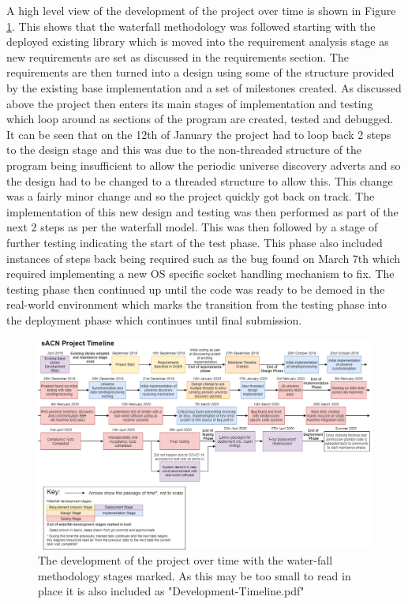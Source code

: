 \documentclass[11pt,a4paper]{article}
\begin{document}
A high level view of the development of the project over time is shown in Figure \ref{project_dev_timeline}. This shows that the waterfall methodology was followed starting with the deployed existing library which is moved into the requirement analysis stage as new requirements are set as discussed in the requirements section. The requirements are then turned into a design using some of the structure provided by the existing base implementation and a set of milestones created. As discussed above the project then enters its main stages of implementation and testing which loop around as sections of the program are created, tested and debugged. It can be seen that on the 12th of January the project had to loop back 2 steps to the design stage and this was due to the non-threaded structure of the program being insufficient to allow the periodic universe discovery adverts and so the design had to be changed to a threaded structure to allow this. This change was a fairly minor change and so the project quickly got back on track. The implementation of this new design and testing was then performed as part of the next 2 steps as per the waterfall model. This was then followed by a stage of further testing indicating the start of the test phase. This phase also included instances of steps back being required such as the bug found on March 7th which required implementing a new OS specific socket handling mechanism to fix. The testing phase then continued up until the code was ready to be demoed in the real-world environment which marks the transition from the testing phase into the deployment phase which continues until final submission.
\begin{figure}[H]
	\begin{turn}{90}
		\begin{minipage}[c][\textwidth][c]{\textheight}
		\centering
			\includegraphics[width=\textwidth]{CS4099-dev-timeline}
			\caption{The development of the project over time with the water-fall methodology stages marked. As this may be too small to read in place it is also included as "Development-Timeline.pdf"}
			\label{project_dev_timeline}
		\end{minipage}
	\end{turn}
\end{figure}
\end{document}
